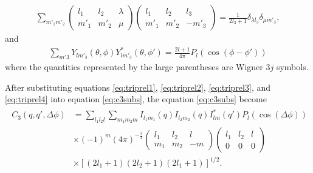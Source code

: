 \begin{align}
\sum_{m'_1 m'_2}\left( \begin{array}{ccc}
l_1 & l_2 & \lambda \\
m'_1 & m'_2 & \mu  \end{array} \right) 
\left( \begin{array}{ccc}
l_1 & l_2 & l_3 \\
m'_1 & m'_2 & -m'_3  \end{array} \right) 
=\frac{1}{2l_3+1} \delta_{\lambda l_3}\delta_{\mu m'_3}, 
\label{eq:triprel3}
\end{align}
and
\begin{align}
\sum_{m'3} Y_{lm'_3}(\theta,\phi) Y^{*}_{lm'_3}(\theta,\phi')=\frac{2l+1}{4 \pi} P_{l}(\cos(\phi-\phi')) 
\label{eq:triprel4}
\end{align}
where the quantities represented by the large parentheses are Wigner $3j$ symbols.

After substituting equations \ref{eq:triprel1}, \ref{eq:triprel2}, \ref{eq:triprel3}, and \ref{eq:triprel4} into equation \ref{eq:c3subs}, the equation \ref{eq:c3subs} become
\begin{align}
\begin{split}
C_{3}(q,q',\Delta \phi)&= \sum_{l_1 l_2 l} \sum_{m_1 m_2 m} I_{l_1 m_1}(q) I_{l_2 m_2}(q) I^{*}_{l m}(q') P_{l}(\cos(\Delta \phi)) \\ 
&\times (-1)^{m}(4\pi)^{-\frac{3}{2}} 
\left( \begin{array}{ccc}
l_1 & l_2 & l \\
m_1 & m_2 & -m  \end{array} \right) 
\left( \begin{array}{ccc}
l_1 & l_2 & l \\
0 & 0 & 0  \end{array} \right)  \\ 
&\times \left[(2l_1+1)(2l_2+1)(2l_1+1)\right]^{1/2}.
\end{split}
\label{eq:tripc3}
\end{align}

